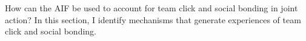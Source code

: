 \begin{CJK}{UTF8}{gbsn}
How can the AIF be used to account for team click and social bonding in joint action? In this section, I identify mechanisms that generate experiences of team click and social bonding.






\end{CJK}
